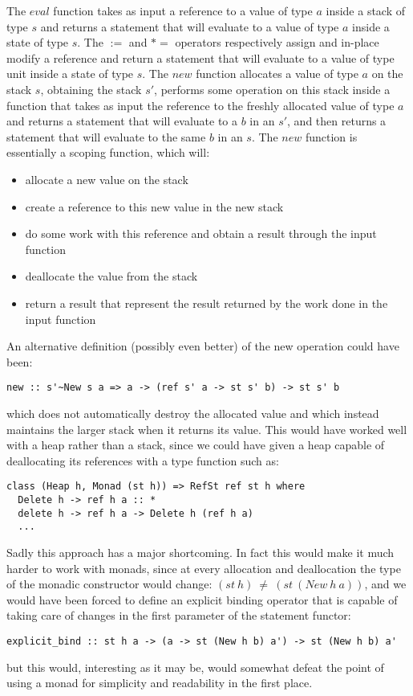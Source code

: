 The $eval$ function takes as input a reference to a value of type $a$ inside a stack of type $s$ and returns a statement that will evaluate 
to a value of type $a$ inside a state of type $s$. The $:=$ and $*=$ operators respectively assign and in-place modify a reference and return
a statement that will evaluate to a value of type unit inside a state of type $s$. The $new$ function allocates a value of type $a$ on the 
stack $s$, obtaining the stack $s'$, performs some operation on this stack inside a function that takes as input the reference to the 
freshly allocated value of type $a$ and returns a statement that will evaluate to a $b$ in an $s'$, and then returns a statement that will
evaluate to the same $b$ in an $s$. The $new$ function is essentially a scoping function, which will:
\begin{itemize}
\item allocate a new value on the stack
\item create a reference to this new value in the new stack
\item do some work with this reference and obtain a result through the input function
\item deallocate the value from the stack
\item return a result that represent the result returned by the work done in the input function
\end{itemize}

An alternative definition (possibly even better) of the new operation could have been:
\begin{verbatim}
new :: s'~New s a => a -> (ref s' a -> st s' b) -> st s' b
\end{verbatim}

which does not automatically destroy the allocated value and which instead maintains the larger stack when it returns its value. This would
have worked well with a heap rather than a stack, since we could have given a heap capable of deallocating its references with a type function
such as:

\begin{verbatim}
class (Heap h, Monad (st h)) => RefSt ref st h where
  Delete h -> ref h a :: *
  delete h -> ref h a -> Delete h (ref h a)
  ...
\end{verbatim}

Sadly this approach has a major shortcoming. In fact this would make it much harder to work with monads, since at every allocation and
deallocation the type of the monadic constructor would change: $(st\ h)\ \ne\ (st\ (New\ h\ a))$, and we would have been forced to define 
an explicit binding operator that is capable of taking care of changes in the first parameter of the statement functor:

\begin{verbatim}
explicit_bind :: st h a -> (a -> st (New h b) a') -> st (New h b) a'
\end{verbatim}

but this would, interesting as it may be, would somewhat defeat the point of using a monad for simplicity and readability in the first place.
